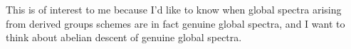 \begin{ideas}
\begin{ideas}
  \item This is of interest to me because I'd like to know when global
    spectra arising from derived groups schemes are in fact genuine
    global spectra, and I want to think about abelian descent of
    genuine global spectra.

  \end{ideas}

\end{ideas}



